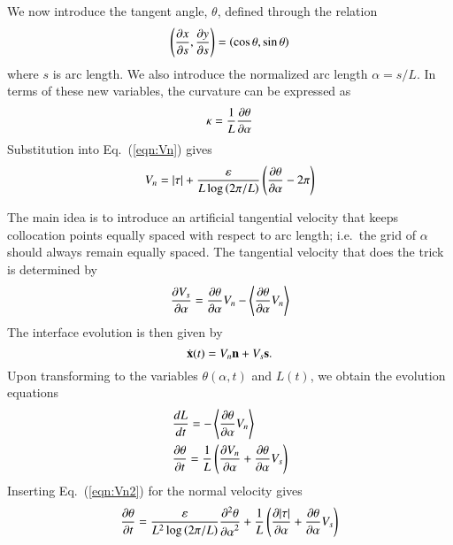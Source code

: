 \documentclass[preprint, 10pt]{elsarticle}
\begin{document}
We now introduce the tangent angle, $\theta$, defined through the relation
\begin{equation}
\left( \frac{\partial x}{\partial s}, \frac{\partial y}{\partial s} \right) = \left(\cos \theta, \sin \theta \right)
\end{equation}
where $s$ is arc length. We also introduce the normalized arc length $\alpha = s / L$. In terms of these new variables, the curvature can be expressed as
\begin{equation}
\kappa = \frac{1}{L} \frac{\partial \theta}{\partial \alpha}
\end{equation}
Substitution into Eq.~(\ref{eqn:Vn}) gives
\begin{equation}
\label{eqn:Vn2}
V_n = \lvert \tau \rvert + \frac{\varepsilon}{L \log \left(2\pi/L \right)}  \left(\frac{\partial \theta}{\partial \alpha} - 2 \pi \right)
\end{equation}

The main idea is to introduce an artificial tangential velocity that keeps collocation points equally spaced with respect to arc length; i.e.~the grid of $\alpha$ should always remain equally spaced. The tangential velocity that does the trick is determined by \cite{hou-low-she1994}
\begin{equation}
\frac{\partial V_s}{\partial \alpha} = \frac{\partial \theta}{\partial \alpha} V_n - \left< \frac{\partial \theta}{\partial \alpha} V_n \right>
\end{equation}
The interface evolution is then given by
\begin{equation}
\dot{{\mathbf{x}}}(t) = V_n {\mathbf{n}} + V_s {\mathbf{s}}.
\end{equation}
Upon transforming to the variables $\theta(\alpha,t)$ and $L(t)$, we obtain the evolution equations
\begin{align}
\label{eqn:Levo0}
& \frac{d L}{d t} = - \left< \frac{\partial \theta}{\partial \alpha} V_n \right> \\
\label{eqn:thetaevo0}
& \frac{\partial \theta}{\partial t} = \frac{1}{L} \left( \frac{\partial V_n}{\partial \alpha} + \frac{\partial \theta}{\partial \alpha} V_s \right)
\end{align}
Inserting Eq.~(\ref{eqn:Vn2}) for the normal velocity gives
\begin{equation}
\frac{\partial \theta}{\partial t} = \frac{\varepsilon}{L^{2} \log \left(2\pi/L \right)} \frac{\partial^2 \theta}{{\partial \alpha}^2} 
+ \frac{1}{L} \left( \frac{\partial \lvert \tau \rvert}{\partial \alpha} + \frac{\partial \theta}{\partial \alpha} V_s \right)
\end{equation}
\end{document}
